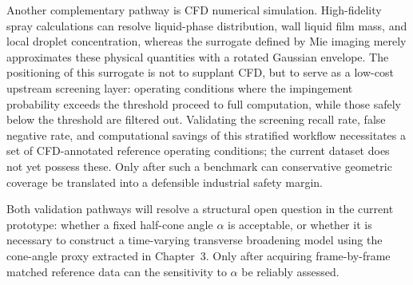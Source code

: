 Another complementary pathway is CFD numerical simulation.
High-fidelity spray calculations can resolve liquid-phase distribution, wall liquid film mass, and local droplet concentration, whereas the surrogate defined by Mie imaging merely approximates these physical quantities with a rotated Gaussian envelope.
The positioning of this surrogate is not to supplant CFD, but to serve as a low-cost upstream screening layer: operating conditions where the impingement probability exceeds the threshold proceed to full computation, while those safely below the threshold are filtered out.
Validating the screening recall rate, false negative rate, and computational savings of this stratified workflow necessitates a set of CFD-annotated reference operating conditions; the current dataset does not yet possess these.
Only after such a benchmark can conservative geometric coverage be translated into a defensible industrial safety margin.

Both validation pathways will resolve a structural open question in the current prototype: whether a fixed half-cone angle \(\alpha\) is acceptable, or whether it is necessary to construct a time-varying transverse broadening model using the cone-angle proxy extracted in Chapter~3.
Only after acquiring frame-by-frame matched reference data can the sensitivity to \(\alpha\) be reliably assessed.
